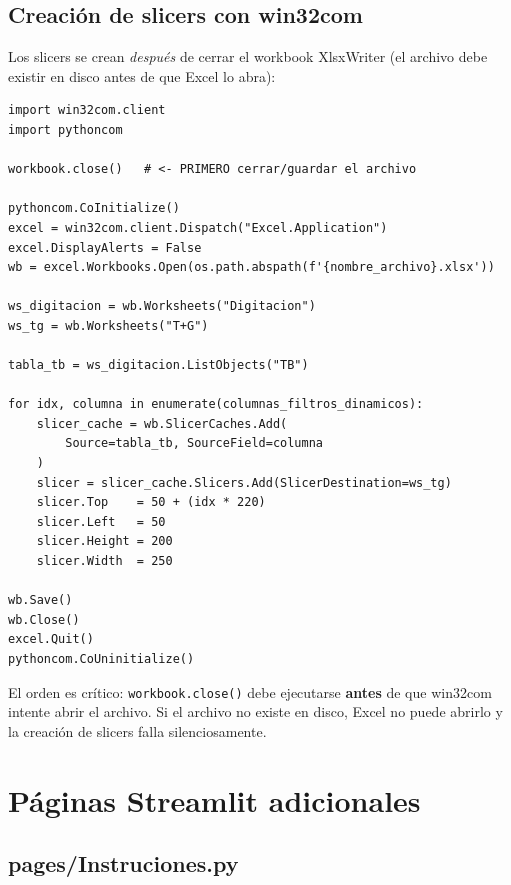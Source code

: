 \documentclass[12pt, letterpaper]{article}
\begin{document}
\subsection{Creación de slicers con win32com}

Los slicers se crean \emph{después} de cerrar el workbook XlsxWriter (el archivo debe existir en disco antes de que Excel lo abra):

\begin{lstlisting}[caption={Creación de slicers mediante COM de Excel}]
import win32com.client
import pythoncom

workbook.close()   # <- PRIMERO cerrar/guardar el archivo

pythoncom.CoInitialize()
excel = win32com.client.Dispatch("Excel.Application")
excel.DisplayAlerts = False
wb = excel.Workbooks.Open(os.path.abspath(f'{nombre_archivo}.xlsx'))

ws_digitacion = wb.Worksheets("Digitacion")
ws_tg = wb.Worksheets("T+G")

tabla_tb = ws_digitacion.ListObjects("TB")

for idx, columna in enumerate(columnas_filtros_dinamicos):
    slicer_cache = wb.SlicerCaches.Add(
        Source=tabla_tb, SourceField=columna
    )
    slicer = slicer_cache.Slicers.Add(SlicerDestination=ws_tg)
    slicer.Top    = 50 + (idx * 220)
    slicer.Left   = 50
    slicer.Height = 200
    slicer.Width  = 250

wb.Save()
wb.Close()
excel.Quit()
pythoncom.CoUninitialize()
\end{lstlisting}

\begin{notadev}
El orden es crítico: \texttt{workbook.close()} debe ejecutarse \textbf{antes} de que win32com intente abrir el archivo. Si el archivo no existe en disco, Excel no puede abrirlo y la creación de slicers falla silenciosamente.
\end{notadev}

\section{Páginas Streamlit adicionales}

\subsection{pages/Instruciones.py}
\end{document}
